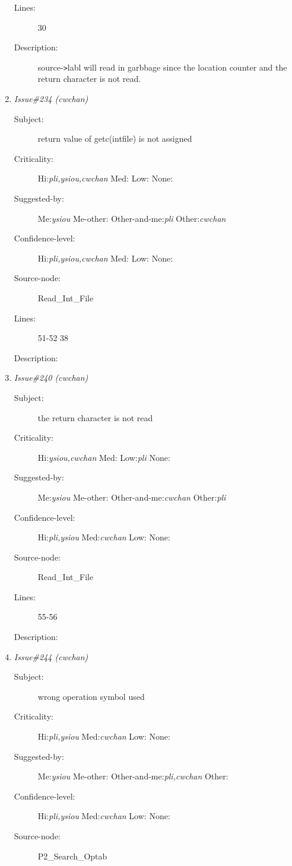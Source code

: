 \begin{enumerate}
\begin{description}
\item [Lines:] 30

\item [Description:] source-{\tt >}labl will read in garbbage since the
location counter and the return character is not read.
\end{description}
\item {\it Issue\#234 (cwchan)}
\begin{description}
\item [Subject:] return value of getc(intfile) is not assigned
\item [Criticality:] Hi:{\it pli,ysiou,cwchan} Med:{\it } Low:{\it } None:{\it }
\item [Suggested-by:] Me:{\it ysiou} Me-other:{\it } Other-and-me:{\it pli} Other:{\it cwchan}
\item [Confidence-level:] Hi:{\it pli,ysiou,cwchan} Med:{\it } Low:{\it } None:{\it }
\item [Source-node:] Read\_Int\_File

\item [Lines:] 51-52 38

\item [Description:] 
\end{description}
\item {\it Issue\#240 (cwchan)}
\begin{description}
\item [Subject:] the return character is not read
\item [Criticality:] Hi:{\it ysiou,cwchan} Med:{\it } Low:{\it pli} None:{\it }
\item [Suggested-by:] Me:{\it ysiou} Me-other:{\it } Other-and-me:{\it cwchan} Other:{\it pli}
\item [Confidence-level:] Hi:{\it pli,ysiou} Med:{\it cwchan} Low:{\it } None:{\it }
\item [Source-node:] Read\_Int\_File

\item [Lines:] 55-56

\item [Description:] 
\end{description}
\item {\it Issue\#244 (cwchan)}
\begin{description}
\item [Subject:] wrong operation symbol used
\item [Criticality:] Hi:{\it pli,ysiou} Med:{\it cwchan} Low:{\it } None:{\it }
\item [Suggested-by:] Me:{\it ysiou} Me-other:{\it } Other-and-me:{\it pli,cwchan} Other:{\it }
\item [Confidence-level:] Hi:{\it pli,ysiou} Med:{\it cwchan} Low:{\it } None:{\it }
\item [Source-node:] P2\_Search\_Optab


\end{description}
\end{enumerate}
